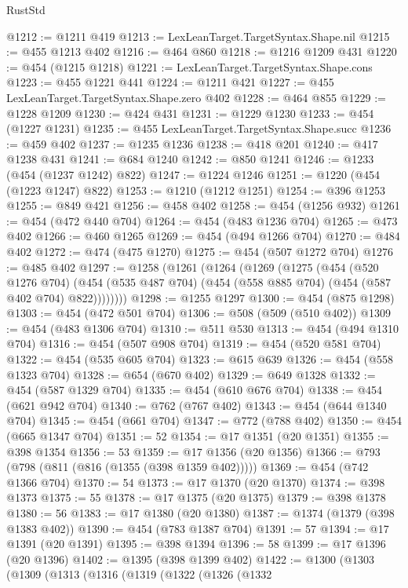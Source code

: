 \begin{lexlean}{RustStd}
\begin{coremodule}
{\begin{coremodule}
{{{{{{{{{{{{{{{{{{{{{{{{{{{{{{{{@1212 := @1211 @419
@1213 := LexLeanTarget.TargetSyntax.Shape.nil
@1215 := @455 @1213 @402
@1216 := @464 @860
@1218 := @1216 @1209 @431
@1220 := @454 (@1215 @1218)
@1221 := LexLeanTarget.TargetSyntax.Shape.cons
@1223 := @455 @1221 @441
@1224 := @1211 @421
@1227 := @455 LexLeanTarget.TargetSyntax.Shape.zero @402
@1228 := @464 @855
@1229 := @1228 @1209
@1230 := @424 @431
@1231 := @1229 @1230
@1233 := @454 (@1227 @1231)
@1235 := @455 LexLeanTarget.TargetSyntax.Shape.succ
@1236 := @459 @402
@1237 := @1235 @1236
@1238 := @418 @201
@1240 := @417 @1238 @431
@1241 := @684 @1240
@1242 := @850 @1241
@1246 := @1233 (@454 (@1237 @1242) @822)
@1247 := @1224 @1246
@1251 := @1220 (@454 (@1223 @1247) @822)
@1253 := @1210 (@1212 @1251)
@1254 := @396 @1253
@1255 := @849 @421
@1256 := @458 @402
@1258 := @454 (@1256 @932)
@1261 := @454 (@472 @440 @704)
@1264 := @454 (@483 @1236 @704)
@1265 := @473 @402
@1266 := @460 @1265
@1269 := @454 (@494 @1266 @704)
@1270 := @484 @402
@1272 := @474 (@475 @1270)
@1275 := @454 (@507 @1272 @704)
@1276 := @485 @402
@1297 := @1258
    (@1261
      (@1264
        (@1269
          (@1275
            (@454
              (@520 @1276 @704)
              (@454 (@535 @487 @704) (@454 (@558 @885 @704) (@454 (@587 @402 @704) @822))))))))
@1298 := @1255 @1297
@1300 := @454 (@875 @1298)
@1303 := @454 (@472 @501 @704)
@1306 := @508 (@509 (@510 @402))
@1309 := @454 (@483 @1306 @704)
@1310 := @511 @530
@1313 := @454 (@494 @1310 @704)
@1316 := @454 (@507 @908 @704)
@1319 := @454 (@520 @581 @704)
@1322 := @454 (@535 @605 @704)
@1323 := @615 @639
@1326 := @454 (@558 @1323 @704)
@1328 := @654 (@670 @402)
@1329 := @649 @1328
@1332 := @454 (@587 @1329 @704)
@1335 := @454 (@610 @676 @704)
@1338 := @454 (@621 @942 @704)
@1340 := @762 (@767 @402)
@1343 := @454 (@644 @1340 @704)
@1345 := @454 (@661 @704)
@1347 := @772 (@788 @402)
@1350 := @454 (@665 @1347 @704)
@1351 := 52
@1354 := @17 @1351 (@20 @1351)
@1355 := @398 @1354
@1356 := 53
@1359 := @17 @1356 (@20 @1356)
@1366 := @793 (@798 (@811 (@816 (@1355 (@398 @1359 @402)))))
@1369 := @454 (@742 @1366 @704)
@1370 := 54
@1373 := @17 @1370 (@20 @1370)
@1374 := @398 @1373
@1375 := 55
@1378 := @17 @1375 (@20 @1375)
@1379 := @398 @1378
@1380 := 56
@1383 := @17 @1380 (@20 @1380)
@1387 := @1374 (@1379 (@398 @1383 @402))
@1390 := @454 (@783 @1387 @704)
@1391 := 57
@1394 := @17 @1391 (@20 @1391)
@1395 := @398 @1394
@1396 := 58
@1399 := @17 @1396 (@20 @1396)
@1402 := @1395 (@398 @1399 @402)
@1422 := @1300
    (@1303
      (@1309
        (@1313
          (@1316
            (@1319
              (@1322
                (@1326
                  (@1332
}}}}}}}}}}}}}}}}}}}}}}}}}}}}}}}}
\end{coremodule}}
\end{coremodule}
\end{lexlean}
